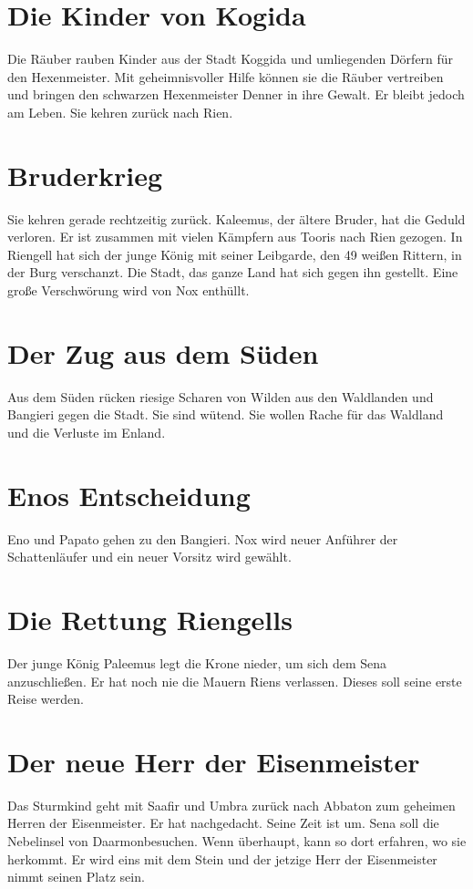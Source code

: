 \documentclass[12pt,a4paper,onecolumn,twoside,ngerman]{book}
\newcommand{\Sena}{Sena}
\newcommand{\Sturmkind}{Sturmkind}
\newcommand{\Bangiri}{Bangieri}
\newcommand{\Papato}{Papato}
\newcommand{\Enland}{Enland}
\newcommand{\Schattenlaufer}{Schattenläufer}
\newcommand{\Eno}{Eno}
\newcommand{\Nox}{Nox}
\newcommand{\Umbra}{Umbra}
\newcommand{\Rhingell}{Riengell}
\newcommand{\Rhin}{Rien}
\newcommand{\Palemus}{Paleemus}
\newcommand{\Kalemus}{Kaleemus}
\newcommand{\Kogida}{Koggida}
\newcommand{\Denner}{Denner}
\newcommand{\Toris}{Tooris}
\newcommand{\Darmon}{Daarmon}
\newcommand{\Eisenmeister}{Eisenmeister}
\newcommand{\Abaton}{Abbaton}
\newcommand{\Safir}{Saafir}
\begin{document}
\section{Die Kinder von Kogida}
Die Räuber rauben Kinder aus der Stadt {\Kogida} und umliegenden Dörfern für den Hexenmeister. Mit geheimnisvoller Hilfe können sie die Räuber vertreiben und bringen den schwarzen Hexenmeister {\Denner} in ihre Gewalt. Er bleibt jedoch am Leben. Sie kehren zurück nach {\Rhin}.

\section{Bruderkrieg}
Sie kehren gerade rechtzeitig zurück. {\Kalemus}, der ältere Bruder, hat die Geduld verloren. Er ist zusammen mit vielen Kämpfern aus {\Toris} nach {\Rhin} gezogen. In {\Rhingell} hat sich der junge König mit seiner Leibgarde, den 49 weißen Rittern, in der Burg verschanzt. Die Stadt, das ganze Land hat sich gegen ihn gestellt.\linebreak
Eine große Verschwörung wird von {\Nox} enthüllt.

\section{Der Zug aus dem Süden}
Aus dem Süden rücken riesige Scharen von Wilden aus den Waldlanden und {\Bangiri} gegen die Stadt. Sie sind wütend. Sie wollen Rache für das Waldland und die Verluste im {\Enland}.

\section{{\Eno}s Entscheidung}
{\Eno} und {\Papato} gehen zu den {\Bangiri}.\linebreak
{\Nox} wird neuer Anführer der {\Schattenlaufer} und ein neuer Vorsitz wird gewählt.

\section{Die Rettung \Rhingell{s}}
Der junge König {\Palemus} legt die Krone nieder, um sich dem {\Sena} anzuschließen. Er hat noch nie die Mauern \Rhin{s} verlassen. Dieses soll seine erste Reise werden.

\section{Der neue Herr der {\Eisenmeister}}
Das {\Sturmkind} geht mit {\Safir} und {\Umbra} zurück nach {\Abaton} zum geheimen Herren der {\Eisenmeister}.\linebreak
Er hat nachgedacht. Seine Zeit ist um. {\Sena} soll die Nebelinsel von \Darmon besuchen. Wenn überhaupt, kann so dort erfahren, wo sie herkommt. Er wird eins mit dem Stein und der jetzige Herr der {\Eisenmeister} nimmt seinen Platz sein.
\end{document}
